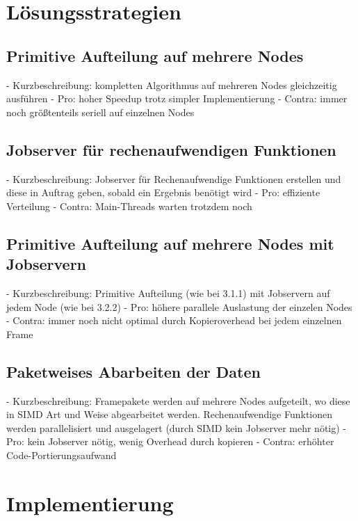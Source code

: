 \iffalse

\section{Lösungsstrategien}

\subsection{Primitive Aufteilung auf mehrere Nodes}

- Kurzbeschreibung: kompletten Algorithmus auf mehreren Nodes gleichzeitig ausführen
- Pro: hoher Speedup trotz simpler Implementierung
- Contra: immer noch größtenteils seriell auf einzelnen Nodes

\subsection{Jobserver für rechenaufwendigen Funktionen}

- Kurzbeschreibung: Jobserver für Rechenaufwendige Funktionen erstellen und diese in Auftrag geben, sobald ein Ergebnis benötigt wird
- Pro: effiziente Verteilung
- Contra: Main-Threads warten trotzdem noch

\subsection{Primitive Aufteilung auf mehrere Nodes mit Jobservern}

- Kurzbeschreibung: Primitive Aufteilung (wie bei 3.1.1) mit Jobservern auf jedem Node (wie bei 3.2.2)
- Pro: höhere parallele Auslastung der einzelen Nodes
- Contra: immer noch nicht optimal durch Kopieroverhead bei jedem einzelnen Frame

\subsection{Paketweises Abarbeiten der Daten}

- Kurzbeschreibung: Framepakete werden auf mehrere Nodes aufgeteilt, wo diese in SIMD Art und Weise abgearbeitet werden. Rechenaufwendige Funktionen werden parallelisiert und ausgelagert (durch SIMD kein Jobserver mehr nötig)
- Pro: kein Jobserver nötig, wenig Overhead durch kopieren
- Contra: erhöhter Code-Portierungsaufwand

\section{Implementierung}

